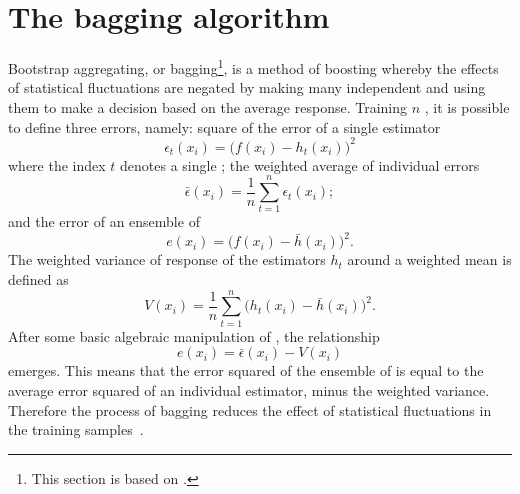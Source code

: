 \section{The bagging algorithm}
\label{sec:bdt:bag}
Bootstrap aggregating, or bagging\footnote{
  This section is based on .}, is a method of boosting whereby the effects of
statistical fluctuations are negated by making many independent \DTs and using them
to make a decision based on the average response.
Training $n$ \DTs, it is possible to define three errors, namely:
square of the error of a single estimator
\begin{equation}
  \epsilon_t(x_i) = \big(f(x_i)-h_t(x_i)\big)^2
  \label{eq:bdt:bag1}
\end{equation}
where the index $t$ denotes a single \DT;
the weighted average of individual errors
\begin{equation}
  \bar\epsilon(x_i) = \frac1n\sum_{t=1}^n\epsilon_t(x_i);
  \label{eq:bdt:bag2}
\end{equation}
and the error of an ensemble of \DTs
\begin{equation}
  e(x_i) = \big(f(x_i)-\bar h(x_i)\big)^2.
  \label{eq:bdt:bag3}
\end{equation}
The weighted variance of response of the estimators $h_t$ around a weighted mean is defined as
\begin{equation}
  V(x_i) = \frac1n\sum_{t=1}^n\big(h_t(x_i) - \bar h(x_i)\big)^2.
  \label{eq:bdt:bag4}
\end{equation}
After some basic algebraic manipulation of , the relationship
\begin{equation}
  e(x_i) = \bar\epsilon(x_i) - V(x_i)
  \label{eq:bdt:bag5}
\end{equation}
emerges.
This means that the error squared of the ensemble of \DTs is equal to the average error squared of an
individual estimator, minus the weighted variance.
Therefore the process of bagging reduces the
effect of statistical fluctuations in the training samples~\cite{Krogh95neuralnetwork}.

